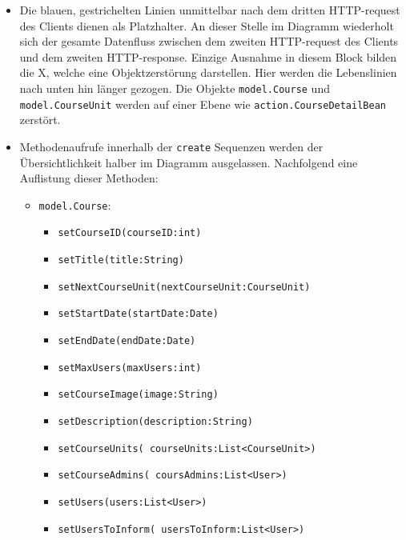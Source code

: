\begin{itemize}

\item Die blauen, gestrichelten Linien unmittelbar nach dem dritten HTTP-request des Clients dienen als Platzhalter. An dieser Stelle im Diagramm wiederholt sich der gesamte Datenfluss zwischen dem zweiten HTTP-request des Clients und dem zweiten HTTP-response. Einzige Ausnahme in diesem Block bilden die X, welche eine Objektzerstörung darstellen. Hier werden die Lebenslinien nach unten hin länger gezogen. Die Objekte \texttt{model.Course} und \texttt{model.CourseUnit} werden auf einer Ebene wie \texttt{action.CourseDetailBean} zerstört.

\item Methodenaufrufe innerhalb der \texttt{create} Sequenzen werden der Übersichtlichkeit halber im Diagramm ausgelassen. Nachfolgend eine Auflistung dieser Methoden:

	\begin{itemize}
	\item \texttt{model.Course}:
		\begin{itemize}
		\item \texttt{setCourseID(courseID:int)}
		\item \texttt{setTitle(title:String)}
		\item \texttt{setNextCourseUnit(nextCourseUnit:CourseUnit)}
		\item \texttt{setStartDate(startDate:Date)}
		\item \texttt{setEndDate(endDate:Date)}
		\item \texttt{setMaxUsers(maxUsers:int)}
		\item \texttt{setCourseImage(image:String)}
		\item \texttt{setDescription(description:String)}
		\item \texttt{setCourseUnits( courseUnits:List<CourseUnit>)}
		\item \texttt{setCourseAdmins( coursAdmins:List<User>)}
		\item \texttt{setUsers(users:List<User>)}
		\item \texttt{setUsersToInform( usersToInform:List<User>)}
		\end{itemize}
	\end{itemize}
	

\end{itemize}
